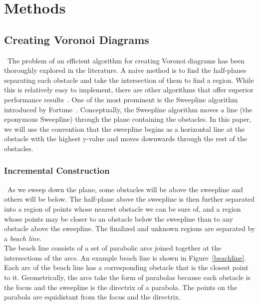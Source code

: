\documentclass[conference]{IEEEtran}
\begin{document}
\section{Methods}
\subsection{Creating Voronoi Diagrams}
\noindent\ The problem of an efficient algorithm for creating Voronoi diagrams has been
thoroughly explored in the literature. A naive method is to find the half-planes
separating each obstacle and take the intersection of them to find a region.
While this is relatively easy to implement, there are other algorithms that
offer superior performance results~\cite{mitslides}. One of the most prominent
is the Sweepline
algorithm introduced by Fortune~\cite{fortune1987sweepline}. Conceptually,
the Sweepline algorithm moves a line (the eponymous Sweepline) through the plane
containing the obstacles. In this paper, we will use the convention that the
sweepline begins as a horizontal line at the obstacle with the highest y-value
and moves downwards through the rest of the obstacles.
\subsubsection{Incremental Construction}
\noindent\ As we sweep down the plane, some obstacles will be above the sweepline and others
will be below. The half-plane above the sweepline is then further separated
into a region of points whose nearest obstacle we can be sure of, and a region
whose points may be closer to an obstacle below the sweepline than to any obstacle
above the sweepline. The finalized and unknown regions are separated by a
\emph{beach line}.\\
\indent The beach line consists of a set of parabolic arcs joined together at
the intersections of the arcs. An example beach line is shown in Figure~\ref{beachline}.
Each arc of the beach line has a corresponding obstacle that is the closest point to
it. Geometrically, the arcs take the form of parabolas because each obstacle is the
focus and the sweepline is the directrix of a parabola. The points on the parabola
are equidistant from the focus and the directrix.
\end{document}
